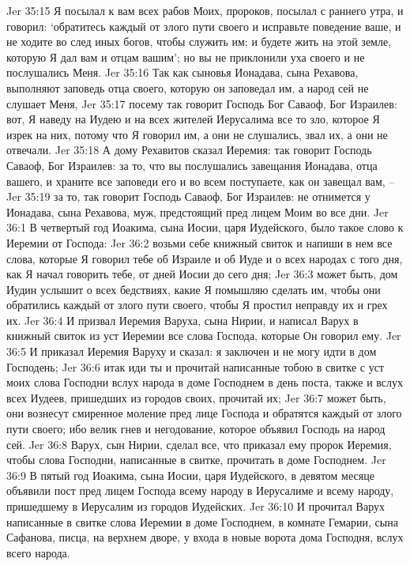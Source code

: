 Jer 35:15  Я посылал к вам всех рабов Моих, пророков, посылал с раннего утра, и говорил: `обратитесь каждый от злого пути своего и исправьте поведение ваше, и не ходите во след иных богов, чтобы служить им; и будете жить на этой земле, которую Я дал вам и отцам вашим'; но вы не приклонили уха своего и не послушались Меня.
Jer 35:16  Так как сыновья Ионадава, сына Рехавова, выполняют заповедь отца своего, которую он заповедал им, а народ сей не слушает Меня,
Jer 35:17  посему так говорит Господь Бог Саваоф, Бог Израилев: вот, Я наведу на Иудею и на всех жителей Иерусалима все то зло, которое Я изрек на них, потому что Я говорил им, а они не слушались, звал их, а они не отвечали.
Jer 35:18  А дому Рехавитов сказал Иеремия: так говорит Господь Саваоф, Бог Израилев: за то, что вы послушались завещания Ионадава, отца вашего, и храните все заповеди его и во всем поступаете, как он завещал вам, --
Jer 35:19  за то, так говорит Господь Саваоф, Бог Израилев: не отнимется у Ионадава, сына Рехавова, муж, предстоящий пред лицем Моим во все дни.
Jer 36:1  В четвертый год Иоакима, сына Иосии, царя Иудейского, было такое слово к Иеремии от Господа:
Jer 36:2  возьми себе книжный свиток и напиши в нем все слова, которые Я говорил тебе об Израиле и об Иуде и о всех народах с того дня, как Я начал говорить тебе, от дней Иосии до сего дня;
Jer 36:3  может быть, дом Иудин услышит о всех бедствиях, какие Я помышляю сделать им, чтобы они обратились каждый от злого пути своего, чтобы Я простил неправду их и грех их.
Jer 36:4  И призвал Иеремия Варуха, сына Нирии, и написал Варух в книжный свиток из уст Иеремии все слова Господа, которые Он говорил ему.
Jer 36:5  И приказал Иеремия Варуху и сказал: я заключен и не могу идти в дом Господень;
Jer 36:6  итак иди ты и прочитай написанные тобою в свитке с уст моих слова Господни вслух народа в доме Господнем в день поста, также и вслух всех Иудеев, пришедших из городов своих, прочитай их;
Jer 36:7  может быть, они вознесут смиренное моление пред лице Господа и обратятся каждый от злого пути своего; ибо велик гнев и негодование, которое объявил Господь на народ сей.
Jer 36:8  Варух, сын Нирии, сделал все, что приказал ему пророк Иеремия, чтобы слова Господни, написанные в свитке, прочитать в доме Господнем.
Jer 36:9  В пятый год Иоакима, сына Иосии, царя Иудейского, в девятом месяце объявили пост пред лицем Господа всему народу в Иерусалиме и всему народу, пришедшему в Иерусалим из городов Иудейских.
Jer 36:10  И прочитал Варух написанные в свитке слова Иеремии в доме Господнем, в комнате Гемарии, сына Сафанова, писца, на верхнем дворе, у входа в новые ворота дома Господня, вслух всего народа.
